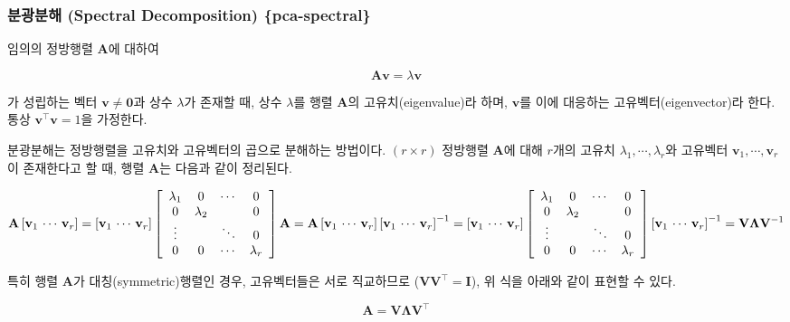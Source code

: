 \documentclass[]{book}
\begin{document}
\hypertarget{-spectral-decomposition-pca-spectral}{%
\subsubsection{분광분해 (Spectral Decomposition) \{pca-spectral\}}\label{-spectral-decomposition-pca-spectral}}

임의의 정방행렬 \(\mathbf{A}\)에 대하여

\[\mathbf{A}\mathbf{v} = \lambda\mathbf{v} \]

가 성립하는 벡터 \(\mathbf{v} \neq \mathbf{0}\)과 상수 \(\lambda\)가 존재할 때, 상수 \(\lambda\)를 행렬 \(\mathbf{A}\)의 고유치(eigenvalue)라 하며, \(\mathbf{v}\)를 이에 대응하는 고유벡터(eigenvector)라 한다. 통상 \(\mathbf{v}^\top \mathbf{v} = 1\)을 가정한다.

분광분해는 정방행렬을 고유치와 고유벡터의 곱으로 분해하는 방법이다. \((r \times r)\) 정방행렬 \(\mathbf{A}\)에 대해 \(r\)개의 고유치 \(\lambda_1, \cdots, \lambda_r\)와 고유벡터 \(\mathbf{v}_1, \cdots, \mathbf{v}_r\)이 존재한다고 할 때, 행렬 \(\mathbf{A}\)는 다음과 같이 정리된다.

\[
\mathbf{A}\left[\mathbf{v}_1 \, \cdots \, \mathbf{v}_r\right] = \left[\mathbf{v}_1 \, \cdots \, \mathbf{v}_r\right] \left[ \begin{array}{c c c c}
\lambda_1 & 0 & \cdots & 0\\
0 & \lambda_2 &  & 0\\
\vdots &  & \ddots & 0\\
0 & 0 & \cdots & \lambda_r
\end{array} \right] \\
\mathbf{A} = \mathbf{A} \left[\mathbf{v}_1 \, \cdots \, \mathbf{v}_r\right] \left[\mathbf{v}_1 \, \cdots \, \mathbf{v}_r\right]^{-1} = \left[\mathbf{v}_1 \, \cdots \, \mathbf{v}_r\right] \left[ \begin{array}{c c c c}
\lambda_1 & 0 & \cdots & 0\\
0 & \lambda_2 &  & 0\\
\vdots &  & \ddots & 0\\
0 & 0 & \cdots & \lambda_r
\end{array} \right] \left[\mathbf{v}_1 \, \cdots \, \mathbf{v}_r\right]^{-1} = \mathbf{V} \mathbf{\Lambda} \mathbf{V}^{-1}
\]

특히 행렬 \(\mathbf{A}\)가 대칭(symmetric)행렬인 경우, 고유벡터들은 서로 직교하므로 (\(\mathbf{V}\mathbf{V}^\top = \mathbf{I}\)), 위 식을 아래와 같이 표현할 수 있다.

\[ \mathbf{A} = \mathbf{V} \mathbf{\Lambda} \mathbf{V}^\top \]
\end{document}
